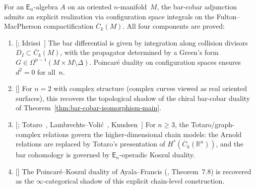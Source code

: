 \begin{theorem}\label{thm:en-koszul-duality-conc}
For an $\mathsf{E}_n$-algebra $A$ on an oriented $n$-manifold~$M$,
the bar-cobar adjunction admits an explicit realization via
configuration space integrals on the Fulton--MacPherson
compactification $\overline{C}_k(M)$.  All four components
are proved:
\begin{enumerate}[label=\textup{(\roman*)}]
\item \textup{[\ClaimStatusProvedElsewhere; Idrissi~\cite{Idrissi22}]}
  The bar differential is given by integration along collision
  divisors $D_I \subset \overline{C}_k(M)$, with the propagator
  determined by a Green's form $G \in \Omega^{n-1}(M \times M
  \setminus \Delta)$.  Poincar\'e duality on configuration spaces
  ensures $d^2 = 0$ for all~$n$.
\item \textup{[\ClaimStatusProvedHere]}
  For $n = 2$ with complex structure \textup{(}complex curves viewed as
  real oriented surfaces\textup{)}, this recovers the topological
  shadow of the chiral bar-cobar duality of
  Theorem~\textup{\ref{thm:bar-cobar-isomorphism-main}}.
\item \textup{[\ClaimStatusProvedElsewhere;
  Totaro~\cite{Totaro96}, Lambrechts--Voli\'c~\cite{LambrechtsVolic14},
  Knudsen~\cite{Knudsen18}]}
  For $n \geq 3$, the Totaro/graph-complex relations govern the
  higher-dimensional chain models:
  the Arnold relations are replaced by Totaro's presentation of
  $H^*(\overline{C}_k(\mathbb{R}^n))$, and the bar cohomology is
  governed by $\mathsf{E}_n$-operadic Koszul duality.
\item \textup{[\ClaimStatusProvedHere]}
  The Poincar\'e--Koszul duality of Ayala--Francis
  \textup{(}\cite{AF15}, Theorem~7.8\textup{)} is recovered as the
  $\infty$-categorical shadow of this explicit chain-level
  construction.
\end{enumerate}
\end{theorem}

